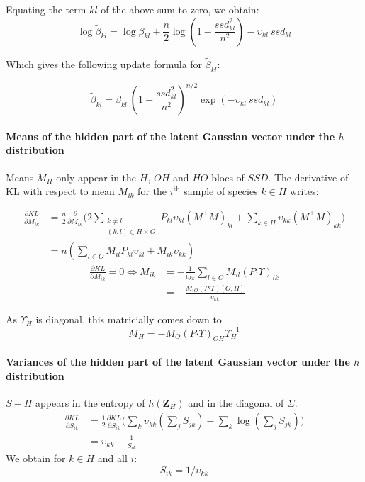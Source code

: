 \documentclass[11pt,a4paper]{article}
\newcommand{\Zbf}{\boldsymbol{Z}}
\newcommand{\had}{\boldsymbol{\cdot}}
\begin{document}
 
Equating the term $kl$ of the above sum to zero, we obtain:
 $$\log \widetilde{\beta}_{kl} = \log \beta_{kl} +  \frac{n}{2} \log  \left(1-\frac{ssd_{kl}^2}{n^2}\right) - \upsilon_{kl}\:ssd_{kl} $$
 
Which gives the following update formula for $\widetilde{\beta}_{kl}$:
 
  $$\boxed{\displaystyle \widetilde{\beta}_{kl} = \beta_{kl} \: \left(1-\frac{ssd_{kl}^2}{n^2}\right)^{n/2} \exp( -\upsilon_{kl}\: ssd_{kl} ) }$$


\paragraph{Means of the hidden part of the latent Gaussian vector under the $h$ distribution \\}
Means $M_H$ only appear in the $H$, $OH$ and $HO$ blocs of $SSD$. The derivative of KL with respect to mean $M_{ik}$ for the $i^\text{th}$ sample of species $k\in H$ writes:

\begin{align*}
\frac{\partial KL}{\partial M_{ik}} &=\frac{n}{2}\frac{\partial}{\partial M_{ik}}\Big(2\sum_{\substack{k \neq l\\
(k, l) \in H\times O}} P_{kl} \upsilon_{kl} (M^\intercal M)_{kl} + \sum_{k\in H} \upsilon_{kk} (M^\intercal M)_{kk}\Big)\\
&= n( \sum_{l \in O } M_{il} P_{kl}\upsilon_{kl} + M_{ik} \upsilon_{kk}) 
\end{align*}
\begin{align*}
\frac{\partial KL}{\partial M_{ik}}  = 0\iff M_{ik} &= -\frac{1}{\upsilon_{kk}} \sum_{l\in O} M_{il} (P\had\Upsilon)_{lk}\\
&=-\frac{M_{iO} (P\had\Upsilon)[O,H]}{\upsilon_{kk}}
\end{align*}

As $\Upsilon_H$ is diagonal, this  matricially comes down to
$$\boxed{ M_H = -M_O(P\had\Upsilon)_{OH} \Upsilon_H^{-1}}$$


\paragraph{Variances of the hidden part of the latent Gaussian vector under the $h$ distribution \\}
$S-H$ appears in the entropy of $h(\Zbf_H)$ and in the diagonal of $\Sigma$. 
\begin{align*}
\frac{\partial KL}{\partial S_{ik}} &= \frac{1}{2}  \frac{\partial KL}{\partial S_{ik}}  \Big(\sum_k \upsilon_{kk}(\sum_j S_{j k}) - \sum_k \log (\sum_jS_{j k})\Big)\\
&=\upsilon_{kk} - \frac{1}{S_{ik}}
\end{align*}
We obtain for $k\in H$ and all $i$:
$$\boxed{S_{ik} = 1/\upsilon_{kk}}$$
\end{document}
